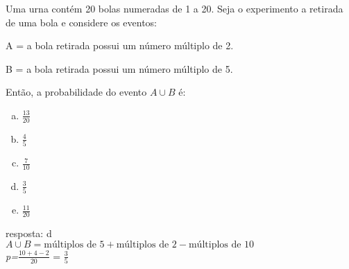 \begin{ex}
 Uma urna contém 20 bolas numeradas de 1 a 20. Seja o experimento a retirada de uma bola e considere os eventos:

A = a bola retirada possui um número múltiplo de 2.

B = a bola retirada possui um número múltiplo de 5.

Então, a probabilidade do evento $A \cup B$ é:

    \begin{enumerate}[(a)]
    \item $\frac{13}{20}$
    \item $\frac{4}{5}$
    \item $\frac{7}{10}$
    \item $\frac{3}{5}$
    \item $\frac{11}{20}$
    \end{enumerate}
\begin{sol}
     resposta: d \\
     $A\cup B = {\text{múltiplos de 5} + \text{múltiplos de 2} - \text{múltiplos de 10}}$\\
     \textit{p=}$\frac{10+4-2}{20}$ = $\frac{3}{5}$ 
     

\end{sol}
\end{ex}